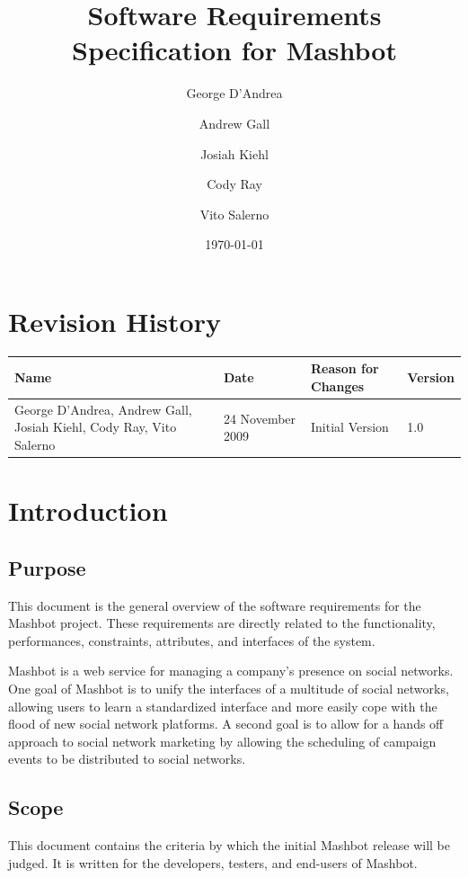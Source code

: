 \documentclass{report}
\begin{document}
\title{Software Requirements Specification for Mashbot} 
\author{George D'Andrea \and Andrew Gall \and Josiah Kiehl \and
  Cody Ray \and Vito Salerno}
\date{\today}
\begin{titlepage}
\maketitle
\end{titlepage}

\section*{Revision History}
\begin{tabular}{|p{2in}|l|l|l|}
  \hline
  \textbf{Name} & \textbf{Date} & \textbf{Reason for Changes} & \textbf{Version} \\
  \hline \hline
  George D'Andrea, Andrew Gall, Josiah Kiehl, Cody Ray, Vito
  Salerno & 24 November 2009 & Initial Version & 1.0 \\
  \hline
\end{tabular}


\tableofcontents

\section{Introduction}

\subsection{Purpose} %
This document is the general overview of the software requirements for
the Mashbot project. These requirements are directly related to the
functionality, performances, constraints, attributes, and interfaces
of the system.

Mashbot is a web service for managing a company's presence on social
networks. One goal of Mashbot is to unify the interfaces of a
multitude of social networks, allowing users to learn a standardized
interface and more easily cope with the flood of new social network
platforms. A second goal is to allow for a hands off approach to
social network marketing by allowing the scheduling of campaign events
to be distributed to social networks.
 
\subsection{Scope} %
This document contains the criteria by which the initial Mashbot
release will be judged. It is written for the developers, testers, and
end-users of Mashbot.
\end{document}
